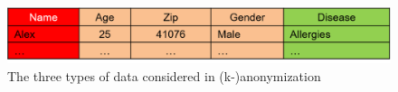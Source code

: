 \documentclass{llncs}
\begin{document}

\begin{figure}[!t]
	\begin{center}
		\includegraphics[width=\textwidth]{figures/theory/3typesofdata}
		\caption{The three types of data considered in (k-)anonymization}
		\label{fig:anon_categories}
	\end{center}
\end{figure}
\end{document}
